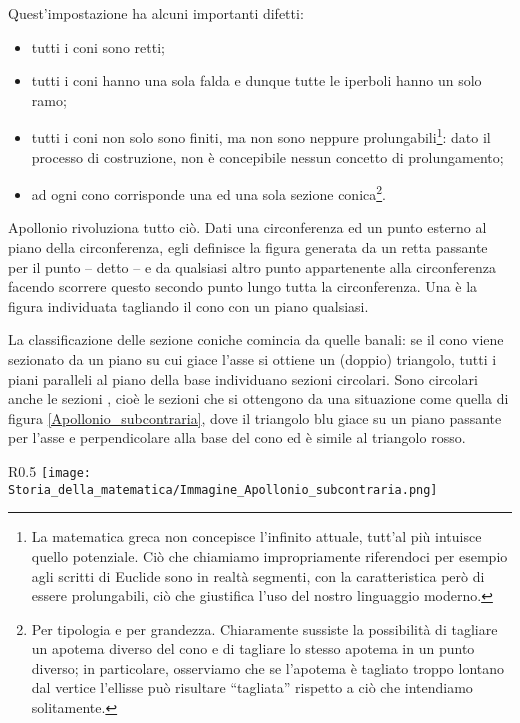 \par Quest'impostazione ha alcuni importanti difetti:
\begin{itemize}
	\item tutti i coni sono retti;
	\item tutti i coni hanno una sola falda e dunque tutte le iperboli hanno un solo ramo;
	\item tutti i coni non solo sono finiti, ma non sono neppure prolungabili\footnote{La matematica greca non concepisce l'infinito attuale, tutt'al pi\`u intuisce quello potenziale. Ci\`o che chiamiamo impropriamente  riferendoci per esempio agli scritti di Euclide sono in realt\`a segmenti, con la caratteristica per\`o di essere prolungabili, ci\`o che giustifica l'uso del nostro linguaggio moderno.}: dato il processo di costruzione, non \`e concepibile nessun concetto di prolungamento;
	\item ad ogni cono corrisponde una ed una sola sezione conica\footnote{Per tipologia e per grandezza. Chiaramente sussiste la possibilit\`a di tagliare un apotema diverso del cono e di tagliare lo stesso apotema in un punto diverso; in particolare, osserviamo che se l'apotema \`e tagliato troppo lontano dal vertice l'ellisse pu\`o risultare ``tagliata'' rispetto a ci\`o che intendiamo solitamente.}.
\end{itemize}
\par Apollonio rivoluziona tutto ci\`o. Dati una circonferenza ed un punto esterno al piano della circonferenza, egli definisce  la figura generata da un retta passante per il punto -- detto  -- e da qualsiasi altro punto appartenente alla circonferenza facendo scorrere questo secondo punto lungo tutta la circonferenza. Una  \`e la figura individuata tagliando il cono con un piano qualsiasi.
\par La classificazione delle sezione coniche comincia da quelle banali: se il cono viene sezionato da un piano su cui giace l'asse si ottiene un (doppio) triangolo, tutti i piani paralleli al piano della base individuano sezioni circolari. Sono circolari anche le sezioni , cio\`e le sezioni che si ottengono da una situazione come quella di figura \ref{Apollonio_subcontraria}, dove il triangolo blu giace su un piano passante per l'asse e perpendicolare alla base del cono ed \`e simile al triangolo rosso.
\begin{wrapfigure}{R}{0.5\textwidth}
	\texttt{[image: Storia\_della\_matematica/Immagine\_Apollonio\_subcontraria.png]}
	\caption{Sezione subcontraria.}
	\label{Apollonio_subcontraria}
\end{wrapfigure}
